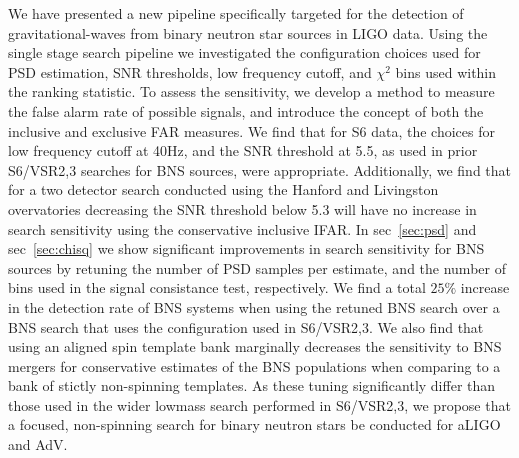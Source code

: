 We have presented a new pipeline specifically targeted for the detection of gravitational-waves from binary neutron star sources in LIGO data. Using the single stage search pipeline we investigated the configuration choices used for PSD estimation, SNR thresholds, low frequency cutoff, and $\chi^2$ bins used within the ranking statistic. To assess the sensitivity, we develop a method to measure the false alarm rate of possible signals, and introduce the concept of both the inclusive and exclusive FAR measures. We find that for S6 data, the choices for low frequency cutoff at 40Hz, and the SNR threshold at 5.5, as used in prior S6/VSR2,3 searches for BNS sources, were appropriate. Additionally, we find that for a two detector search conducted using the Hanford and Livingston overvatories decreasing the SNR threshold below 5.3 will have no increase in search sensitivity using the conservative inclusive IFAR. In sec~\ref{sec:psd} and sec~\ref{sec:chisq} we show significant improvements in search sensitivity for BNS sources by retuning the number of PSD samples per estimate, and the number of bins used in the signal consistance test, respectively. We find a total $25\%$ increase in the detection rate of BNS systems when using the retuned BNS search over a BNS search that uses the configuration used in S6/VSR2,3. We also find that using an aligned spin template bank marginally decreases the sensitivity 
to BNS mergers for conservative estimates of the BNS populations when comparing to a bank of stictly non-spinning templates. As these tuning significantly differ than those used in the wider lowmass search performed in S6/VSR2,3, we propose that a focused, non-spinning search for binary neutron stars be conducted for aLIGO and AdV.

\label{sec:conclusions}
